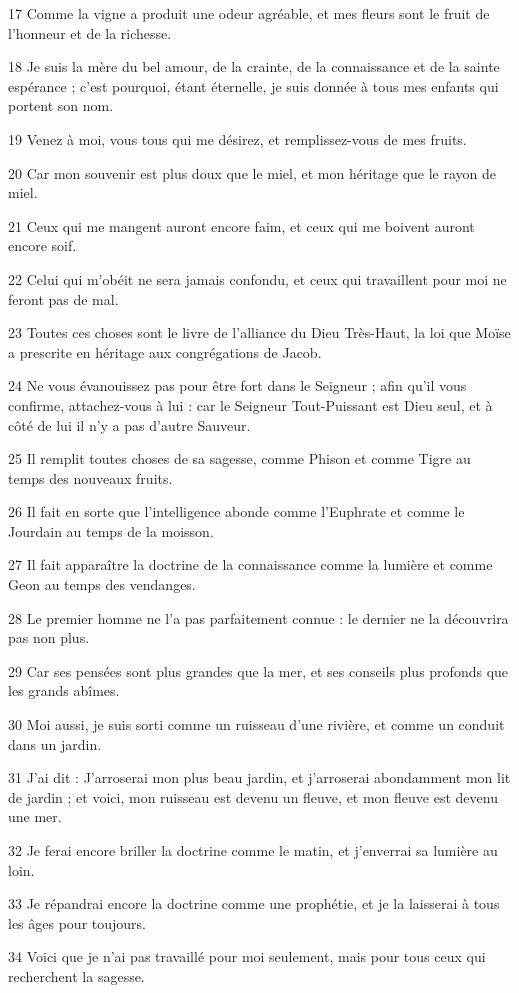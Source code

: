 \par 17 Comme la vigne a produit une odeur agréable, et mes fleurs sont le fruit de l'honneur et de la richesse.
\par 18 Je suis la mère du bel amour, de la crainte, de la connaissance et de la sainte espérance ; c'est pourquoi, étant éternelle, je suis donnée à tous mes enfants qui portent son nom.
\par 19 Venez à moi, vous tous qui me désirez, et remplissez-vous de mes fruits.
\par 20 Car mon souvenir est plus doux que le miel, et mon héritage que le rayon de miel.
\par 21 Ceux qui me mangent auront encore faim, et ceux qui me boivent auront encore soif.
\par 22 Celui qui m'obéit ne sera jamais confondu, et ceux qui travaillent pour moi ne feront pas de mal.
\par 23 Toutes ces choses sont le livre de l'alliance du Dieu Très-Haut, la loi que Moïse a prescrite en héritage aux congrégations de Jacob.
\par 24 Ne vous évanouissez pas pour être fort dans le Seigneur ; afin qu'il vous confirme, attachez-vous à lui : car le Seigneur Tout-Puissant est Dieu seul, et à côté de lui il n'y a pas d'autre Sauveur.
\par 25 Il remplit toutes choses de sa sagesse, comme Phison et comme Tigre au temps des nouveaux fruits.
\par 26 Il fait en sorte que l'intelligence abonde comme l'Euphrate et comme le Jourdain au temps de la moisson.
\par 27 Il fait apparaître la doctrine de la connaissance comme la lumière et comme Geon au temps des vendanges.
\par 28 Le premier homme ne l'a pas parfaitement connue : le dernier ne la découvrira pas non plus.
\par 29 Car ses pensées sont plus grandes que la mer, et ses conseils plus profonds que les grands abîmes.
\par 30 Moi aussi, je suis sorti comme un ruisseau d'une rivière, et comme un conduit dans un jardin.
\par 31 J'ai dit : J'arroserai mon plus beau jardin, et j'arroserai abondamment mon lit de jardin ; et voici, mon ruisseau est devenu un fleuve, et mon fleuve est devenu une mer.
\par 32 Je ferai encore briller la doctrine comme le matin, et j'enverrai sa lumière au loin.
\par 33 Je répandrai encore la doctrine comme une prophétie, et je la laisserai à tous les âges pour toujours.
\par 34 Voici que je n'ai pas travaillé pour moi seulement, mais pour tous ceux qui recherchent la sagesse.


